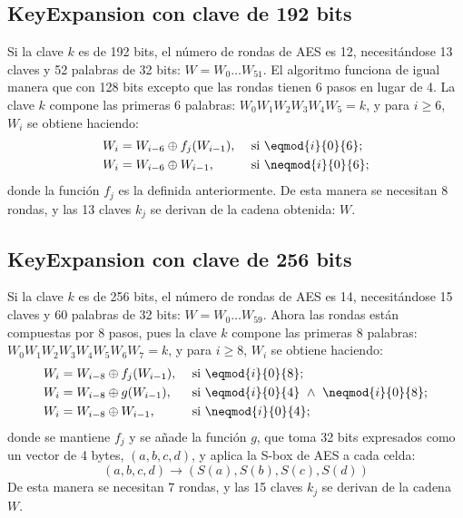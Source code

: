 \subsection{KeyExpansion con clave de 192 bits}
Si la clave $k$ es de 192 bits, el número de rondas de AES es 12, necesitándose 13 claves y 52 palabras de 32 bits: $W = W_0\ldots W_{51}$. El algoritmo funciona de igual manera que con 128 bits excepto que las rondas tienen 6 pasos en lugar de 4. La clave $k$ compone las primeras 6 palabras: $W_0W_1W_2W_3W_4W_5 = k$, y para $i\geq6$, $W_i$ se obtiene haciendo:
\begin{align*}
    &&W_i &= W_{i-6}  \oplus f_j(W_{i-1}), &&\text{ si } \eqmod{i}{0}{6};&&\\
    &&W_i &= W_{i-6}  \oplus W_{i-1}, &&\text{ si } \neqmod{i}{0}{6};&&
\end{align*}
donde la función $f_j$ es la definida anteriormente. De esta manera se necesitan 8 rondas, y las 13 claves $k_j$ se derivan de la cadena obtenida: $W$.

\vspace{-0.5em}
\subsection{KeyExpansion con clave de 256 bits}
Si la clave $k$ es de 256 bits, el número de rondas de AES es 14, necesitándose 15 claves y 60 palabras de 32 bits: $W = W_0\ldots W_{59}$. Ahora las rondas están compuestas por 8 pasos, pues la clave $k$ compone las primeras 8 palabras: $W_0W_1W_2W_3W_4W_5W_6W_7 = k$, y para $i\geq8$, $W_i$ se obtiene haciendo:
\begin{align*}
    &&W_i &= W_{i-8}  \oplus f_j(W_{i-1}), &&\text{ si } \eqmod{i}{0}{8};&&\\
    &&W_i &= W_{i-8}  \oplus g(W_{i-1}), &&\text{ si } \eqmod{i}{0}{4} \ \land\ \neqmod{i}{0}{8};&&\\
    &&W_i &= W_{i-8}  \oplus W_{i-1}, &&\text{ si } \neqmod{i}{0}{4};&&
\end{align*}
donde se mantiene $f_j$ y se añade la función $g$, que toma 32 bits expresados como un vector de 4 bytes, $(a,b,c,d)$, y aplica la S-box de AES a cada celda:\vspace{-0.5em}
\[(a,b,c,d) \to (S(a),S(b),S(c),S(d))\]
De esta manera se necesitan 7 rondas, y las 15 claves $k_j$ se derivan de la cadena $W$.